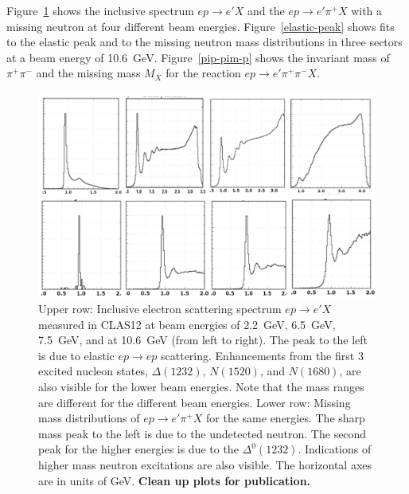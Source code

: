 \documentclass[final,3p,twocolumn]{elsarticle}
\begin{document}
Figure~\ref{spectrum} shows the inclusive spectrum $ep \to e' X$ and the $ep \to e' \pi^+ X$ with a missing
neutron at four different beam energies. Figure~\ref{elastic-peak} shows fits to the elastic peak and to the
missing neutron mass distributions in three sectors at a beam energy of 10.6~GeV. Figure~\ref{pip-pim-p} shows
the invariant mass of $\pi^+\pi^-$ and the missing mass $M_X$ for the reaction $ep \to e' \pi^+ \pi^- X$.  

\begin{figure}[ht]
\centerline{\includegraphics[width=1.0\columnwidth]{W-spectrum.png}}
\caption{Upper row: Inclusive electron scattering spectrum $ep \to e' X$ measured in CLAS12 at beam energies 
of 2.2~GeV, 6.5~GeV, 7.5~GeV, and at 10.6~GeV (from left to right). The peak to the left is due to elastic $ep \to ep$
scattering. Enhancements from the first 3 excited nucleon states, $\Delta(1232)$, $N(1520)$, and $N(1680)$, are also
visible for the lower beam energies. Note that the mass ranges  are different for the different beam energies. Lower
row:  Missing mass distributions of $ep\to e' \pi^+X$ for the same energies. The sharp mass peak to the left is due
to the undetected neutron. The second peak for the higher energies is due to the $\Delta^0(1232)$. Indications of higher
mass neutron excitations are also visible. The horizontal axes are in units of GeV. {\bf Clean up plots for publication.}} 
\label{spectrum}
\end{figure} 
\end{document}

